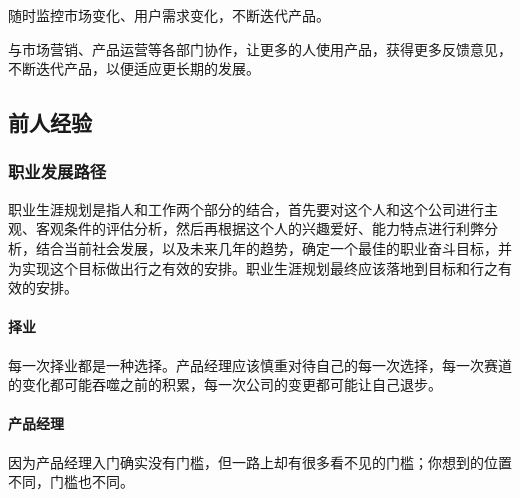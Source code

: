 \documentclass[letterpaper,11pt,english]{sphinxmanual}
\begin{document}
随时监控市场变化、用户需求变化，不断迭代产品。

与市场营销、产品运营等各部门协作，让更多的人使用产品，获得更多反馈意见，不断迭代产品，以便适应更长期的发展。


\subsection{前人经验}
\label{\detokenize{chapter_experience/index:chap-exper}}\label{\detokenize{chapter_experience/index:id1}}\label{\detokenize{chapter_experience/index::doc}}

\subsubsection{职业发展路径}
\label{\detokenize{chapter_experience/career_path:id1}}\label{\detokenize{chapter_experience/career_path::doc}}
职业生涯规划是指人和工作两个部分的结合，首先要对这个人和这个公司进行主观、客观条件的评估分析，然后再根据这个人的兴趣爱好、能力特点进行利弊分析，结合当前社会发展，以及未来几年的趋势，确定一个最佳的职业奋斗目标，并为实现这个目标做出行之有效的安排。职业生涯规划最终应该落地到目标和行之有效的安排。


\paragraph{择业}
\label{\detokenize{chapter_experience/career_path:id2}}
每一次择业都是一种选择。产品经理应该慎重对待自己的每一次选择，每一次赛道的变化都可能吞噬之前的积累，每一次公司的变更都可能让自己退步。


\paragraph{产品经理}
\label{\detokenize{chapter_experience/career_path:id3}}

因为产品经理入门确实没有门槛，但一路上却有很多看不见的门槛；你想到的位置不同，门槛也不同。%
\begin{footnote}[597]\sphinxAtStartFootnote
{}
%
\end{footnote}
\end{document}
